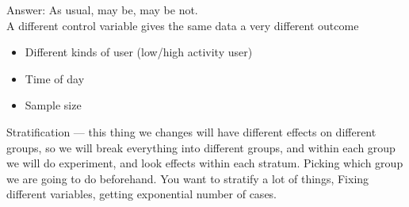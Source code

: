 \noindent Answer: As usual, may be, may be not.\\
A different control variable gives the same data a very different outcome\\
\begin{itemize}
  \item Different kinds of user (low/high activity user)
  \item Time of day
  \item Sample size
\end{itemize}

\noindent Stratification --- this thing we changes will have different effects on different groups, so we will break everything into different groups, and within each group we will do experiment, and look effects within each stratum. Picking which group we are going to do beforehand. You want to stratify a lot of things, Fixing different variables, getting exponential number of cases.\\

